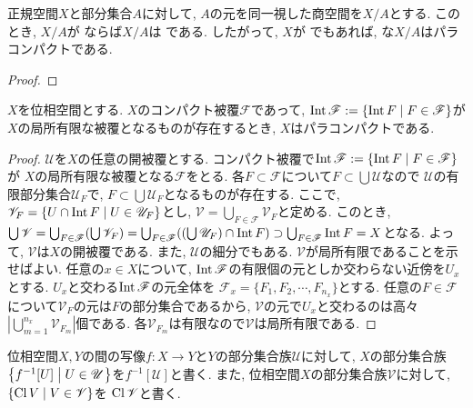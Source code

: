 \documentclass[uplatex, dvipdfmx, a4paper, 12pt, class=jsbook, crop=false]{standalone}
\begin{document}
\begin{proposition}
	正規空間$ X $と部分集合$ A $に対して, $ A $の元を同一視した商空間を$ X / A $とする.
	このとき, $ X / A $が  ならば$ X / A $は  である.
	したがって, $ X $が \Lindelof でもあれば, な$ X / A $はパラコンパクトである.
\end{proposition}
\begin{proof}
	\WIP
\end{proof}

\begin{proposition}
	\label{prop:existence of a compact covering whose interior is a locally finite covering>ParaCpt}
	$ X $を位相空間とする. $ X $のコンパクト被覆$\mathscr{F}$であって,
	$\topint \mathscr{F} \defeq \setcomp{\topint F}{F \in \mathscr{F}}$が$X$の局所有限な被覆となるものが存在するとき,
	$ X $はパラコンパクトである.
\end{proposition}

\begin{proof}
	$ \mathscr{U} $を$ X $の任意の開被覆とする.
	コンパクト被覆で$\topint\mathscr{F} \defeq \setcomp{\topint F}{F \in \mathscr{F}}$が
	$ X $の局所有限な被覆となる$ \mathscr{F} $をとる.
	各$ F \subset \mathscr{F} $について$ F \subset \bigcup \mathscr{U} $なので
	$ \mathscr{U} $の有限部分集合$ \mathscr{U}_F  $で, $ F \subset \bigcup \mathscr{U}_F $となるものが存在する.
	ここで, $ \mathscr{V}_F = \setcomp{U \cap \topint F}{U \in \mathscr{U}_F}$とし,
	$ \mathscr{V} = \bigcup_{F \in \mathscr{F}} \mathscr{V}_F $と定める.
	このとき, $ \bigcup \mathscr{V}=\bigcup_{F\in\mathscr{F}}(\bigcup \mathscr{V}_F)
	= \bigcup_{F\in \mathscr{F}}((\bigcup \mathscr{U}_F) \cap \mathop{\mathrm{Int}}\nolimits F) \supset \bigcup_{F\in\mathscr{F}}\mathop{\mathrm{Int}}\nolimits F = X $となる.
	よって, $ \mathscr{V} $は$ X $の開被覆である.
	また, $ \mathscr{U} $の細分でもある. $ \mathscr{V} $が局所有限であることを示せばよい.
	任意の$ x \in X $について, $ \mathop{\mathrm{Int}}\nolimits \mathscr{F} $の有限個の元としか交わらない近傍を$U_x$とする.
	$ U_x $と交わる$ \mathop{\mathrm{Int}}\nolimits \mathscr{F} $の元全体を
	$ \mathscr{F}_x = \{F_{1}, F_{2} ,\cdots, F_{n_x}\} $とする.
	任意の$ F \in \mathscr{F} $について$ \mathscr{V}_F $の元は$ F $の部分集合であるから,
	$ \mathscr{V} $の元で$ U_x $と交わるのは高々$ |\bigcup_{m=1}^{n_x} \mathscr{V}_{F_m}| $個である.
	各$ \mathscr{V}_{F_m} $は有限なので$ \mathscr{V} $は局所有限である.
\end{proof}

\begin{definition}
	位相空間$ X, Y $の間の写像$ f \colon X \to Y $と$ Y $の部分集合族$ \mathscr{U} $に対して,
	$ X $の部分集合族$ \setcomp{f^{-1}[U]}{U \in \mathscr{U}} $を$ f^{-1}[\mathscr{U}] $と書く.
	また, 位相空間$ X $の部分集合族$ \mathscr{V} $に対して, $ \setcomp{\topcl V}{V \in \mathscr{V}} $を
	$ \mathop{\mathrm{Cl}}\nolimits \mathscr{V} $と書く.
\end{definition}
\end{document}
